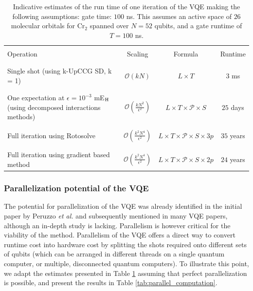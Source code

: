 \begin{table}
\caption{Indicative estimates of the run time of one iteration of the VQE making the following assumptions: gate time: $100$ ns. This assumes an active space of $26$ molecular orbitals for $\mathrm{Cr_2}$ spanned over $N=52$ qubits, and a gate runtime of $T=100$ ns.} \label{tab:runtime_noiseless_iteration}
\begin{tabularx}{\linewidth}{Xccc}
\toprule
\\
Operation & Scaling & Formula & Runtime \\
\\ \midrule \\
Single shot (using k-UpCCG SD, k = 1) & $\mathcal{O}(kN)$ &  $L \times T$ & $3$ ms \\
\\ \hline \\
One expectation at $\epsilon = 10^{-3}$ mE$_{\rm H}$ (using decomposed interactions methods) & $\mathcal{O}( \frac{kN^2}{\epsilon^2})$ &  $L \times T \times \mathcal{P} \times S$ & $25$ days \\
\\ \hline \\
Full iteration using Rotosolve & $\mathcal{O}(\frac{k^2N^4}{\epsilon^2})$ &  $L \times T \times \mathcal{P} \times S \times 3p$ & $35$ years \\
\\ \hline \\
Full iteration using gradient based method & $\mathcal{O}(\frac{k^2N^4}{\epsilon^2})$ &  $L \times T \times \mathcal{P} \times S \times 2p$  & $24$ years \\
\bottomrule
\end{tabularx}
\end{table}


\subsubsection{Parallelization potential of the VQE} \label{sec:parallelization}

The potential for parallelization of the VQE was already identified in the initial paper by Peruzzo {\it et al.} \cite{Peruzzo2014} and subsequently mentioned in many VQE papers, although an in-depth study is lacking. Parallelism is however critical for the viability of the method. Parallelism of the VQE offers a direct way to convert runtime cost into hardware cost by splitting the shots required onto different sets of qubits (which can be arranged in different threads on a single quantum computer, or multiple, disconnected quantum computers). To illustrate this point, we adapt the estimates presented in Table \ref{tab:runtime_noiseless_iteration} assuming that perfect parallelization is possible, and present the results in Table \ref{tab:parallel_computation}. 


